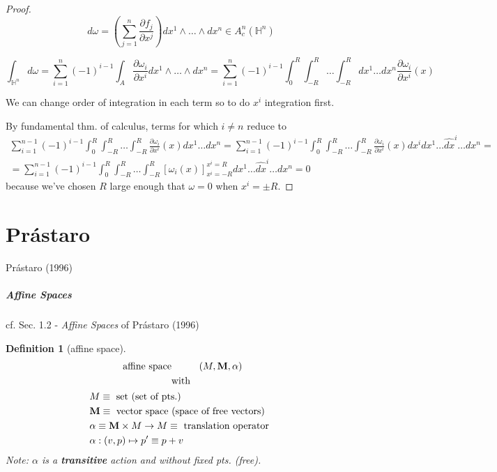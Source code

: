 \documentclass[10pt]{amsart}
\newtheorem{definition}{Definition}
\begin{document}
\begin{multicols*}{2}
\begin{proof}
\[
d\omega = \left( \sum_{j=1}^n \frac{\partial f_j}{ \partial x^j} \right) dx^1 \wedge \dots \wedge dx^n \in A_c^n(\mathbb{H}^n)
\]

\[
\int_{\mathbb{H}^n} d\omega = \sum_{i=1}^n (-1)^{i-1} \int_A \frac{ \partial \omega_i}{ \partial x^i } dx^1 \wedge \dots \wedge dx^n = \sum_{i=1}^n (-1)^{i-1} \int_0^R \int_{-R}^R \dots \int_{-R}^R dx^1 \dots dx^n \frac{ \partial \omega_i}{\partial x^i}(x)
\]

We can change order of integration in each term so to do $x^i$ integration first. 

By fundamental thm. of calculus, terms for which $i\neq n$ reduce to 
\[
\begin{gathered}
\sum_{i=1}^{n-1} (-1)^{i-1} \int_0^R \int_{-R}^R \dots \int_{-R}^R \frac{\partial \omega_i}{\partial x^i}(x) dx^1 \dots dx^n = \sum_{i=1}^{n-1} (-1)^{i-1} \int_0^R \int_{-R}^R \dots \int_{-R}^R \frac{\partial \omega_i}{\partial x^i}(x) dx^i dx^1 \dots \widehat{dx}^i \dots dx^n = \\
= \sum_{i=1}^{n-1} (-1)^{i-1} \int_0^R \int_{-R}^R \dots \int_{-R}^R [\omega_i(x)]_{x^i = -R}^{x^i = R} dx^1 \dots \widehat{dx}^i \dots dx^n = 0 
\end{gathered} 
\]
because we've chosen $R$ large enough that $\omega =0 $ when $x^i = \pm R$.  
	
	
\end{proof}

\part{Pr\'{a}staro}

Pr\'{a}staro (1996) \cite{Pras1996}

\subsubsection{Affine Spaces}

cf. Sec. 1.2 - \emph{Affine Spaces} of Pr\'{a}staro (1996) \cite{Pras1996}

\begin{definition}[affine space]
  \begin{equation}
\begin{gathered}
    \text{ affine space \qquad \, } (M, \mathbf{M}, \alpha )  \\
    \text{ with } \\
    \begin{aligned}
      & M \equiv \text{ set (set of pts.) }  \\ 
      & \mathbf{M} \equiv \text{ vector space (space of free vectors) } \\
      & \alpha \equiv \mathbf{M} \times M \to M \equiv \text{ translation operator } \\
      & \alpha : (v,p ) \mapsto p' \equiv p + v
      \end{aligned}
\end{gathered}
  \end{equation}
  Note: $\alpha$ is a \textbf{transitive} action and without fixed pts. (free).


\end{definition}
\end{multicols*}
\end{document}
